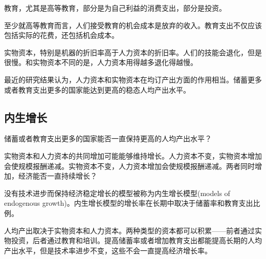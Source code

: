 \documentclass{article}
\begin{document}
教育，尤其是高等教育，部分是为自己利益的消费支出，部分是投资。

至少就高等教育而言，人们接受教育的机会成本是放弃的收入。教育支出不仅应该包括实际的花费，还包括机会成本。

实物资本，特别是机器的折旧率高于人力资本的折旧率。人们的技能会退化，但是很慢。和实物资本不同的是，人力资本用得越多退化得越慢。

最近的研究结果认为，人力资本和实物资本在均订产出方面的作用相当。储蓄更多或者教育支出更多的国家能达到更高的稳态人均产出水平。

\subsection{内生增长}

储蓄或者教育支出更多的国家能否一直保持更高的人均产出水平？

实物资本和人力资本的共同增加可能能够维持增长。人力资本不变，实物资本增加会使规模报酬递减。实物资本不变，人力资本增加会使规模报酬递减。两者同时增加，经济能否一直持续增长？

没有技术进步而保持经济稳定增长的模型被称为内生增长模型(models of endogenous growth)。内生增长模型的增长率在长期中取决于储蓄率和教育支出比例。

\hspace*{\fill}

人均产出取决于实物资本和人力资本。两种类型的资本都可以积累——前者通过实物投资，后者通过教育和培训。提高储蓄率或者增加教育支出都能提高长期的人均产出水平，但是技术率进步不变，这些不会一直提高经济增长率。





































	
\end{document}

